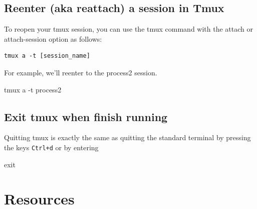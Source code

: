 \documentclass[
  letterpaper,
  DIV=11,
  numbers=noendperiod]{scrreprt}
\newenvironment{Shaded}{\begin{snugshade}}{\end{snugshade}}
\newcommand{\AttributeTok}[1]{\textcolor[rgb]{0.40,0.45,0.13}{#1}}
\newcommand{\BuiltInTok}[1]{\textcolor[rgb]{0.00,0.23,0.31}{#1}}
\newcommand{\ExtensionTok}[1]{\textcolor[rgb]{0.00,0.23,0.31}{#1}}
\newcommand{\NormalTok}[1]{\textcolor[rgb]{0.00,0.23,0.31}{#1}}
\begin{document}
\hypertarget{reenter-aka-reattach-a-session-in-tmux}{%
\subsection*{Reenter (aka reattach) a session in
Tmux}\label{reenter-aka-reattach-a-session-in-tmux}}

To reopen your tmux session, you can use the tmux command with the
attach or attach-session option as follows:

\begin{verbatim}
tmux a -t [session_name]
\end{verbatim}

For example, we'll reenter to the process2 session.

\begin{Shaded}
\begin{Highlighting}[]
\ExtensionTok{tmux}\NormalTok{ a }\AttributeTok{{-}t}\NormalTok{ process2}
\end{Highlighting}
\end{Shaded}

\hypertarget{exit-tmux-when-finish-running}{%
\subsection*{Exit tmux when finish
running}\label{exit-tmux-when-finish-running}}

Quitting tmux is exactly the same as quitting the standard terminal by
pressing the keys \texttt{Ctrl+d} or by entering

\begin{Shaded}
\begin{Highlighting}[]
\BuiltInTok{exit}
\end{Highlighting}
\end{Shaded}

\hypertarget{resources}{%
\section{Resources}\label{resources}}
\end{document}
